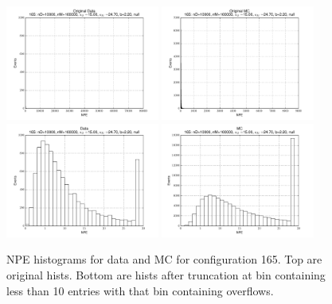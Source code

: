  \begin{figure}[htbp] \begin{center} 
\includegraphics[width=0.45\textwidth]{../FIGURES/165/FIG_Original_Data.pdf} 
\includegraphics[width=0.45\textwidth]{../FIGURES/165/FIG_Original_MC.pdf} 
\includegraphics[width=0.45\textwidth]{../FIGURES/165/FIG_Data.pdf} 
\includegraphics[width=0.45\textwidth]{../FIGURES/165/FIG_MC.pdf} 
\caption{NPE histograms for data and MC for configuration 165. Top are original hists. Bottom are hists after truncation at bin containing less than 10 entries with that bin containing overflows.} 
\label{tab:npe_165} 
\end{center} \end{figure} 
\clearpage
 